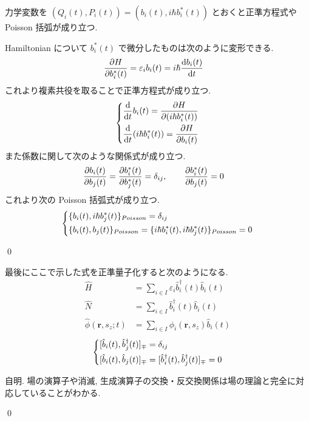 \documentclass[uplatex,dvipdfmx,a4paper,11pt]{jlreq}
\makeatletter
\newcommand{\rr}{\bm{r}}
\numberwithin{equation}{section}
\theoremstyle{definition}
\renewenvironment{proof}[1][\proofname]{\par
  \normalfont
  \topsep6\p@\@plus6\p@ \trivlist
  \item[\hskip\labelsep{\bfseries #1}\@addpunct{\bfseries}]\ignorespaces\quad\par
}{
  \qed\endtrivlist\@endpefalse
}
\renewcommand\proofname{証明}
\makeatother
\begin{document}
\begin{theorem}
  力学変数を $(Q_i(t), P_i(t)) = (b_i(t), i\hbar b_i^*(t))$ とおくと正準方程式や Poisson 括弧が成り立つ.
\end{theorem}
\begin{proof}
  Hamiltonian について $b_i^*(t)$ で微分したものは次のように変形できる.
  \begin{align}
    \diffp{H}{b_i^*(t)} & = \varepsilon_ib_i(t) = i\hbar\diff{b_i(t)}{t}
  \end{align}
  これより複素共役を取ることで正準方程式が成り立つ.
  \begin{align}
    \begin{dcases}
      \diff{}{t}b_i(t) = \diffp{H}{(i\hbar b_i^*(t))} \\
      \diff{}{t}(i\hbar b_i^*(t)) = \diffp{H}{b_i(t)}
    \end{dcases}
  \end{align}
  また係数に関して次のような関係式が成り立つ.
  \begin{align}
    \diffp{b_i(t)}{b_j(t)} & = \diffp{b_i^*(t)}{b_j^*(t)} = \delta_{ij}, \qquad \diffp{b_i^*(t)}{b_j(t)} = 0
  \end{align}
  これより次の Poisson 括弧式が成り立つ.
  \begin{align}
    \begin{dcases}
      \{b_i(t), i\hbar b_j^*(t)\}_{Poisson} = \delta_{ij} \\
      \{b_i(t), b_j(t)\}_{Poisson} = \{i\hbar b_i^*(t), i\hbar b_j^*(t)\}_{Poisson} = 0
    \end{dcases}
  \end{align}
\end{proof}

\begin{theorem}[Q21-102(ix)(x)(xi)(xii)]
  最後にここで示した式を正準量子化すると次のようになる.
  \begin{align}
    \hat{H}                 & = \sum_{i\in I}\varepsilon_i\hat{b}_i^\dagger(t)\hat{b}_i(t) \\
    \hat{N}                 & = \sum_{i\in I}\hat{b}_i^\dagger(t)\hat{b}_i(t)              \\
    \hat{\phi}(\rr, s_z; t) & = \sum_{i\in I}\phi_i(\rr, s_z)\hat{b}_i(t)
  \end{align}
  \begin{align}
    \begin{dcases}
      [\hat{b}_i(t), \hat{b}_j^\dagger(t)]_\mp = \delta_{ij} \\
      [\hat{b}_i(t), \hat{b}_j(t)]_\mp = [\hat{b}_i^\dagger(t), \hat{b}_j^\dagger(t)]_\mp = 0
    \end{dcases}
  \end{align}
\end{theorem}
\begin{proof}
  自明. 場の演算子や消滅, 生成演算子の交換・反交換関係は場の理論と完全に対応していることがわかる.
\end{proof}
\end{document}
